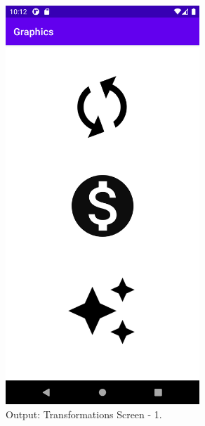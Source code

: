 \documentclass[12pt, a4]{article}
\begin{document}
\subsection*{}
\begin{figure}[h]
\centering
\caption{Output: Transformations Screen - 1.}
\includegraphics[height=15cm, width=7.3cm]{Graphics/Screenshots/Graphics-5.png}
\end{figure}

\newpage
\end{document}
